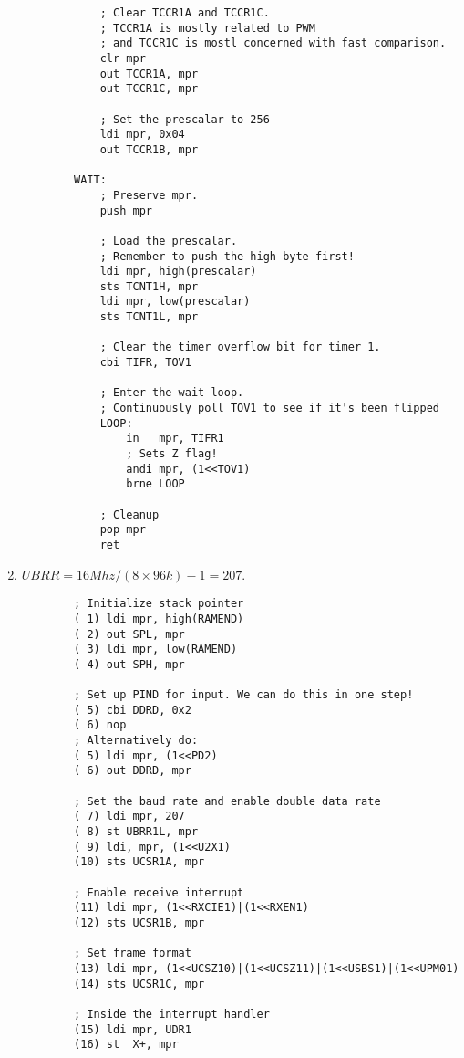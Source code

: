 \documentclass[12pt,letterpaper]{article}
\begin{document}
\begin{enumerate}
\begin{verbatim}
            ; Clear TCCR1A and TCCR1C.
            ; TCCR1A is mostly related to PWM
            ; and TCCR1C is mostl concerned with fast comparison.
            clr mpr
            out TCCR1A, mpr
            out TCCR1C, mpr

            ; Set the prescalar to 256
            ldi mpr, 0x04
            out TCCR1B, mpr

        WAIT:
            ; Preserve mpr.
            push mpr

            ; Load the prescalar.
            ; Remember to push the high byte first!
            ldi mpr, high(prescalar)
            sts TCNT1H, mpr
            ldi mpr, low(prescalar)
            sts TCNT1L, mpr

            ; Clear the timer overflow bit for timer 1.
            cbi TIFR, TOV1

            ; Enter the wait loop.
            ; Continuously poll TOV1 to see if it's been flipped
            LOOP:
                in   mpr, TIFR1
                ; Sets Z flag!
                andi mpr, (1<<TOV1)
                brne LOOP

            ; Cleanup
            pop mpr
            ret
    \end{verbatim}
    \item $UBRR = 16 Mhz/(8 \times 96k) -1 = 207$.
    \begin{verbatim}
        ; Initialize stack pointer
        ( 1) ldi mpr, high(RAMEND)
        ( 2) out SPL, mpr
        ( 3) ldi mpr, low(RAMEND)
        ( 4) out SPH, mpr

        ; Set up PIND for input. We can do this in one step!
        ( 5) cbi DDRD, 0x2
        ( 6) nop
        ; Alternatively do:
        ( 5) ldi mpr, (1<<PD2)
        ( 6) out DDRD, mpr

        ; Set the baud rate and enable double data rate
        ( 7) ldi mpr, 207
        ( 8) st UBRR1L, mpr
        ( 9) ldi, mpr, (1<<U2X1)
        (10) sts UCSR1A, mpr

        ; Enable receive interrupt
        (11) ldi mpr, (1<<RXCIE1)|(1<<RXEN1)
        (12) sts UCSR1B, mpr

        ; Set frame format
        (13) ldi mpr, (1<<UCSZ10)|(1<<UCSZ11)|(1<<USBS1)|(1<<UPM01)
        (14) sts UCSR1C, mpr

        ; Inside the interrupt handler
        (15) ldi mpr, UDR1
        (16) st  X+, mpr
    \end{verbatim}
\end{enumerate}
\end{document}

